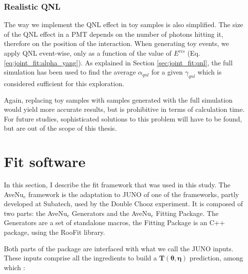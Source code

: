 \documentclass[../main.tex]{subfiles}
\begin{document}
\subsubsection{Realistic QNL}

The way we implement the QNL effect in toy samples is also simplified. The size of the QNL effect in a PMT depends on the number of photons hitting it, therefore on the position of the interaction. When generating toy events, we apply QNL event-wise, only as a function of the value of $E^{vis}$ (Eq. \ref{eq:joint_fit:alpha_yang}). As explained in Section \ref{sec:joint_fit:qnl}, the full simulation has been used to find the average $\alpha_{qnl}$ for a given $\gamma_{qnl}$ which is considered sufficient for this exploration.

Again, replacing toy samples with samples generated with the full simulation would yield more accurate results, but is prohibitive in terms of calculation time. For future studies, sophisticated solutions to this problem  will have to be found, but are out of the scope of this thesis.


\section{Fit software}
\label{sec:joint_fit:framework}

In this section, I describe the fit framework that was used in this study. The AveNu$_e$ framework is the adaptation to JUNO of one of the frameworks, partly developed at Subatech, used by the Double Chooz \cite{double_chooz_collaboration_double_2022} experiment. It is composed of two parts: the AveNu$_e$ Generators and the AveNu$_e$ Fitting Package. The Generators are a set of standalone macros, the Fitting Package is an C++ package, using the RooFit library.


Both parts of the package are interfaced with what we call the JUNO inputs.
These inputs comprise all the ingredients to build a $\bm{T}(\bm{\theta}, \bm{\eta})$ prediction, among which :
\end{document}
